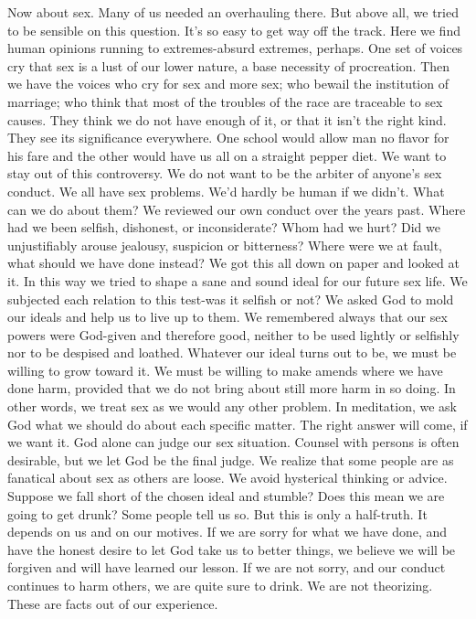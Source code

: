 \begin{biblechapter}
Now about sex.  Many of us needed an overhauling there.  But above all, we tried to be sensible on this question.  It's so easy to get way off the track.  Here we find human opinions running to extremes-absurd extremes, perhaps.  One set of voices cry that sex is a lust of our lower nature, a base necessity of procreation.  Then we have the voices who cry for sex and more sex; who bewail the institution of marriage; who think that most of the troubles of the race are traceable to sex causes.  They think we do not have enough of it, or that it isn't the right kind.  They see its significance everywhere.  One school would allow man no flavor for his fare and the other would have us all on a straight pepper diet.  We want to stay out of this controversy.  We do not want to be the arbiter of anyone's sex conduct.  We all have sex problems.  We'd hardly be human if we didn't.  What can we do about them?
We reviewed our own conduct over the years past.  Where had we been selfish, dishonest, or inconsiderate?  Whom had we hurt?  Did we unjustifiably arouse jealousy, suspicion or bitterness?  Where were we at fault, what should we have done instead?  We got this all down on paper and looked at it.
In this way we tried to shape a sane and sound ideal for our future sex life.  We subjected each relation to this test-was it selfish or not?  We asked God to mold our ideals and help us to live up to them.  We remembered always that our sex powers were God-given and therefore good, neither to be used lightly or selfishly nor to be despised and loathed.
Whatever our ideal turns out to be, we must be willing to grow toward it.  We must be willing to make amends where we have done harm,  provided that we do not bring about still more harm in so doing.  In other words, we treat sex as we would any other problem.  In meditation, we ask God what we should do about each specific matter.  The right answer will come, if we want it.
God alone can judge our sex situation.  Counsel with persons is often desirable, but we let God be the final judge.  We realize that some people are as fanatical about sex as others are loose.  We avoid hysterical thinking or advice.
Suppose we fall short of the chosen ideal and stumble?  Does this mean we are going to get drunk?  Some people tell us so.  But this is only a half-truth.  It depends on us and on our motives.  If we are sorry for what we have done, and have the honest desire to let God take us to better things, we believe we will be forgiven and will have learned our lesson.  If we are not sorry, and our conduct continues to harm others, we are quite sure to drink.  We are not theorizing.  These are facts out of our experience.

\end{biblechapter}

